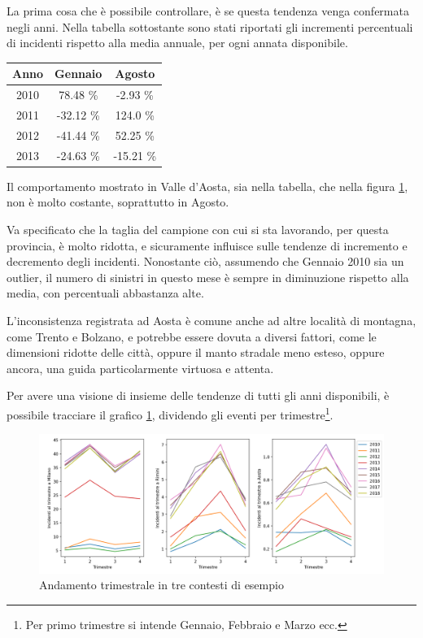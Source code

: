 \documentclass[a4paper]{report}
\begin{document}
La prima cosa che è possibile controllare, è se questa tendenza venga confermata negli anni. 
Nella tabella sottostante sono stati riportati gli incrementi percentuali di incidenti 
rispetto alla media annuale, per ogni annata disponibile. 

\begin{center}
    \def\arraystretch{1.5}%
    \begin{tabular}{ |c|c|c| } 
    \hline
    Anno & Gennaio & Agosto \\ 
    \hline
    \rowcolor{TableGray}
    2010 & 78.48 \%  & -2.93 \%\\ 
    2011 & -32.12 \% & 124.0 \%\\
    \rowcolor{TableGray}
    2012 & -41.44 \% & 52.25 \% \\
    2013 & -24.63 \% & -15.21 \% \\
    \hline
    \end{tabular}
\end{center}

Il comportamento mostrato in Valle d'Aosta, sia nella tabella, 
che nella figura \ref{fig:aosta-rimini-milano-trimestre}, non è molto costante, 
soprattutto in Agosto. 

Va specificato che la taglia del campione con cui si sta lavorando, per questa provincia, 
è molto ridotta, e sicuramente influisce sulle tendenze di incremento e decremento 
degli incidenti. 
Nonostante ciò, assumendo che Gennaio 2010 sia un outlier, il numero di sinistri in 
questo mese è sempre in diminuzione rispetto alla media, con percentuali abbastanza alte. 

L'inconsistenza registrata ad Aosta è comune anche ad altre località di montagna, come Trento e 
Bolzano, e potrebbe essere dovuta a diversi fattori, come 
le dimensioni ridotte delle città, oppure il manto stradale meno esteso, oppure ancora, 
una guida particolarmente virtuosa e attenta.

Per avere una visione di insieme delle tendenze di tutti gli anni disponibili, 
è possibile tracciare 
il grafico \ref{fig:aosta-rimini-milano-trimestre}, dividendo gli eventi 
per trimestre\footnote{Per primo trimestre si intende Gennaio, Febbraio e Marzo ecc.}. 

\begin{figure}
    \includegraphics[width=\linewidth]{../src/incidenti/incidenti_senza_coords/mese_incidenti/trimestri_aosta_milano_rimini.png}
    \caption{Andamento trimestrale in tre contesti di esempio}
    \label{fig:aosta-rimini-milano-trimestre}
\end{figure}
\end{document}
